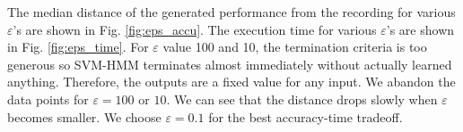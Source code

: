 
%
%
The median distance of the generated performance from the recording for various $\varepsilon$'s are shown in Fig. \ref{fig:eps_accu}. The execution time for various $\varepsilon$'s are shown in Fig. \ref{fig:eps_time}. For $\varepsilon$ value 100 and 10, the termination criteria is too generous so SVM-HMM terminates almost immediately without actually learned anything. Therefore, the outputs are a fixed value for any input. We abandon the data points for $\varepsilon = 100$ or $10$. We can see that the distance drops slowly when $\varepsilon$ becomes smaller. We choose $\varepsilon = 0.1$ for the best accuracy-time tradeoff. %

